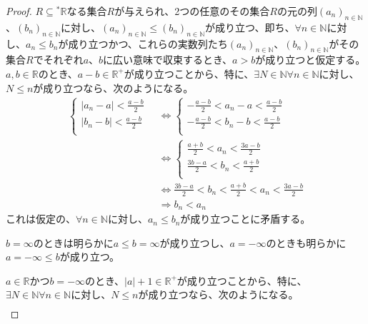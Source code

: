 \documentclass[dvipdfmx]{jsarticle}
\begin{document}
\begin{proof}
$R \subseteq{}^{*}\mathbb{R}$なる集合$R$が与えられ、2つの任意のその集合$R$の元の列$\left( a_{n} \right)_{n \in \mathbb{N}}$、$\left( b_{n} \right)_{n \in \mathbb{N}}$に対し、$\left( a_{n} \right)_{n \in \mathbb{N}} \leq \left( b_{n} \right)_{n \in \mathbb{N}}$が成り立つ、即ち、$\forall n \in \mathbb{N}$に対し、$a_{n} \leq b_{n}$が成り立つかつ、これらの実数列たち$\left( a_{n} \right)_{n \in \mathbb{N}}$、$\left( b_{n} \right)_{n \in \mathbb{N}}$がその集合$R$でそれぞれ$a$、$b$に広い意味で収束するとき、$a > b$が成り立つと仮定する。$a,b \in \mathbb{R}$のとき、$a - b \in \mathbb{R}^{+}$が成り立つことから、特に、$\exists N \in \mathbb{N}\forall n \in \mathbb{N}$に対し、$N \leq n$が成り立つなら、次のようになる。
\begin{align*}
\left\{ \begin{matrix}
\left| a_{n} - a \right| < \frac{a - b}{2} \\
\left| b_{n} - b \right| < \frac{a - b}{2} \\
\end{matrix} \right.\  &\Leftrightarrow \left\{ \begin{matrix}
 - \frac{a - b}{2} < a_{n} - a < \frac{a - b}{2} \\
 - \frac{a - b}{2} < b_{n} - b < \frac{a - b}{2} \\
\end{matrix} \right.\ \\
&\Leftrightarrow \left\{ \begin{matrix}
\frac{a + b}{2} < a_{n} < \frac{3a - b}{2} \\
\frac{3b - a}{2} < b_{n} < \frac{a + b}{2} \\
\end{matrix} \right.\ \\
&\Leftrightarrow \frac{3b - a}{2} < b_{n} < \frac{a + b}{2} < a_{n} < \frac{3a - b}{2}\\
&\Rightarrow b_{n} < a_{n}
\end{align*}
これは仮定の、$\forall n \in \mathbb{N}$に対し、$a_{n} \leq b_{n}$が成り立つことに矛盾する。\par
$b = \infty$のときは明らかに$a \leq b = \infty$が成り立つし、$a = - \infty$のときも明らかに$a = - \infty \leq b$が成り立つ。\par
$a \in \mathbb{R}$かつ$b = - \infty$のとき、$|a| + 1 \in \mathbb{R}^{+}$が成り立つことから、特に、$\exists N \in \mathbb{N}\forall n \in \mathbb{N}$に対し、$N \leq n$が成り立つなら、次のようになる。
\begin{align*}

\end{align*}
\end{proof}
\end{document}
